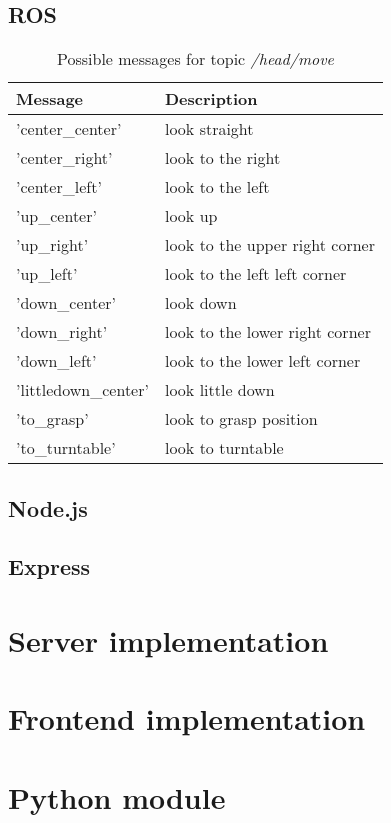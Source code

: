 \subsection{ROS} \label{sub:ros}
\begin{table}
	\centering
	\begin{tabular}{l l}
		\toprule
		Message              & Description                    \\
		\midrule
		'center\_center'     & look straight                  \\
		'center\_right'      & look to the right              \\
		'center\_left'       & look to the left               \\
		'up\_center'         & look up                        \\
		'up\_right'          & look to the upper right corner \\
		'up\_left'           & look to the left left corner   \\
		'down\_center'       & look down                      \\
		'down\_right'        & look to the lower right corner \\
		'down\_left'         & look to the lower left corner  \\
		'littledown\_center' & look little down               \\
		'to\_grasp'          & look to grasp position         \\
		'to\_turntable'      & look to turntable              \\
		\bottomrule
	\end{tabular}
	\caption{Possible messages for topic \textit{/head/move}}
	\label{tab:headMoveCommands}
\end{table}
\subsection{Node.js}
\subsection{Express}

\section{Server implementation}
\section{Frontend implementation}
\section{Python module}